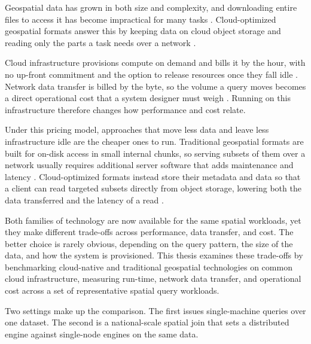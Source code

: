 Geospatial data has grown in both size and complexity, and downloading entire files to access it has become impractical for many tasks \parencite{cngfoundation2024_cloud_optimized_geospatial_formats_guide}. Cloud-optimized geospatial formats answer this by keeping data on cloud object storage and reading only the parts a task needs over a network \parencite{cngfoundation2024_cloud_optimized_geospatial_formats_guide}.

Cloud infrastructure provisions compute on demand and bills it by the hour, with no up-front commitment and the option to release resources once they fall idle \parencite{armbrust2010_view_of_cloud_computing}. Network data transfer is billed by the byte, so the volume a query moves becomes a direct operational cost that a system designer must weigh \parencite{armbrust2010_view_of_cloud_computing}. Running on this infrastructure therefore changes how performance and cost relate.

Under this pricing model, approaches that move less data and leave less infrastructure idle are the cheaper ones to run. Traditional geospatial formats are built for on-disk access in small internal chunks, so serving subsets of them over a network usually requires additional server software that adds maintenance and latency \parencite{cngfoundation2024_cloud_optimized_geospatial_formats_guide}. Cloud-optimized formats instead store their metadata and data so that a client can read targeted subsets directly from object storage, lowering both the data transferred and the latency of a read \parencite{cngfoundation2024_cloud_optimized_geospatial_formats_guide}.

Both families of technology are now available for the same spatial workloads, yet they make different trade-offs across performance, data transfer, and cost. The better choice is rarely obvious, depending on the query pattern, the size of the data, and how the system is provisioned. This thesis examines these trade-offs by benchmarking cloud-native and traditional geospatial technologies on common cloud infrastructure, measuring run-time, network data transfer, and operational cost across a set of representative spatial query workloads.

Two settings make up the comparison. The first issues single-machine queries over one dataset. The second is a national-scale spatial join that sets a distributed engine against single-node engines on the same data.








